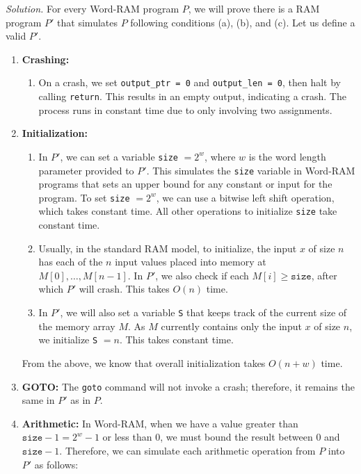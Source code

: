 \documentclass[11pt]{article}
\begin{document}
\begin{enumerate}
\textit{Solution. }For every Word-RAM program $P$, we will prove there is a RAM program $P'$ that simulates $P$ following conditions (a), (b), and (c). Let us define a valid $P'$.
\begin{enumerate}
    \item \textbf{Crashing: } 
    \begin{enumerate}
        \item On a crash, we set \texttt{output\_ptr = 0} and \texttt{output\_len = 0}, then halt by calling \texttt{return}. This results in an empty output, indicating a crash. The process runs in constant time due to only involving two assignments.
    \end{enumerate}
    \item \textbf{Initialization: } 
    \begin{enumerate}
        \item In $P'$, we can set a variable \texttt{size} $= 2^w$, where $w$ is the word length parameter provided to $P'$. This simulates the \texttt{size} variable in Word-RAM programs that sets an upper bound for any constant or input for the program. To set \texttt{size} $= 2^w$, we can use a bitwise left shift operation, which takes constant time. All other operations to initialize \texttt{size} take constant time.
        \item Usually, in the standard RAM model, to initialize, the input $x$ of size $n$ has each of the $n$ input values placed into memory at $M[0], \ldots, M[n-1]$. In $P'$, we also check if each $M[i] \geq \texttt{size}$, after which $P'$ will crash. This takes $O(n)$ time.
        \item In $P'$, we will also set a variable \texttt{S} that keeps track of the current size of the memory array $M$. As $M$ currently contains only the input $x$ of size $n$, we initialize \texttt{S} $= n$. This takes constant time.
    \end{enumerate}
    From the above, we know that overall initialization takes $O(n + w)$ time.
    \item \textbf{GOTO: } The \texttt{goto} command will not invoke a crash; therefore, it remains the same in $P'$ as in $P$.
    \item \textbf{Arithmetic: } In Word-RAM, when we have a value greater than $\texttt{size} - 1 = 2^w - 1$ or less than $0$, we must bound the result between $0$ and $\texttt{size} - 1$. Therefore, we can simulate each arithmetic operation from $P$ into $P'$ as follows:
    \begin{enumerate}

\end{enumerate}
\end{enumerate}
\end{enumerate}
\end{document}
